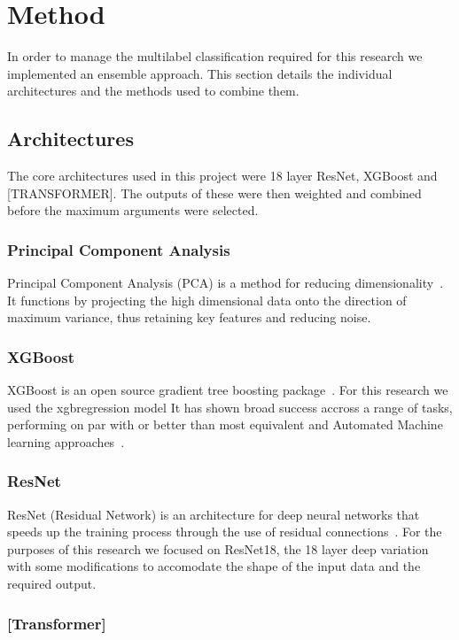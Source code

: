 \section{Method}

In order to manage the multilabel classification required for this research we implemented an ensemble approach. 
This section details the individual architectures and the methods used to combine them.

\subsection{Architectures}

The core architectures used in this project were 18 layer ResNet, XGBoost and [TRANSFORMER]. The outputs of these were 
then weighted and combined before the maximum arguments were selected.

\subsubsection{Principal Component Analysis}
Principal Component Analysis (PCA) is a method for reducing dimensionality~\cite{pcapaper}. It functions by projecting the high dimensional data onto the direction of maximum variance, thus retaining key features and reducing noise.



\subsubsection{XGBoost}
XGBoost is an open source gradient tree boosting package~\cite{xgboost}. 
For this research we used the xgbregression model It has shown broad success accross a range of tasks, performing on par with or better than most equivalent and Automated Machine learning approaches~\cite{xgbcomp}.
\subsubsection{ResNet}
ResNet (Residual Network) is an architecture for deep neural networks that speeds up the training process through the use of residual connections~\cite{resnet}. 
For the purposes of this research we focused on ResNet18, the 18 layer deep variation with some modifications to accomodate the shape of the input data and the required output. 
\subsubsection{[Transformer]}

